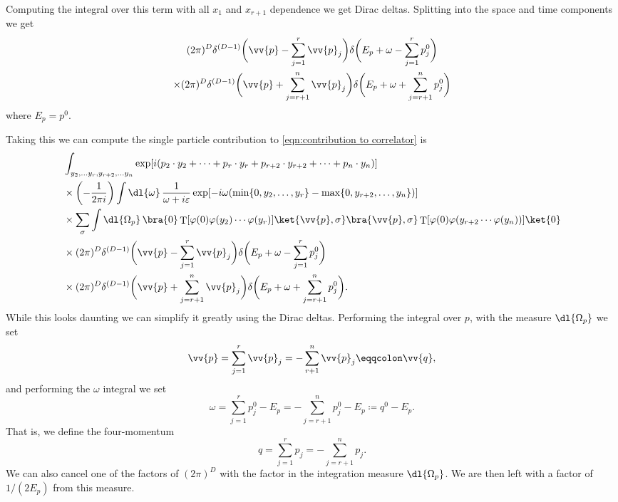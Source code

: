 \documentclass[fleqn]{NotesClass}
\DeclareMathOperator{\timeOrdering}{T}
\begin{document}
    Computing the integral over this term with all \(x_1\) and \(x_{r+1}\) dependence we get Dirac deltas.
    Splitting into the space and time components we get
    \begin{multline}
        (2\pi)^D\delta^{(D-1)}\bigg( \vv{p} - \sum_{j=1}^{r} \vv{p}_j \bigg) \delta\bigg( E_p + \omega - \sum_{j=1}^{r} p_j^0 \bigg)\\
        \times (2\pi)^D \delta^{(D-1)}\bigg( \vv{p} + \sum_{j=r+1}^{n} \vv{p}_j \bigg) \delta\bigg( E_p + \omega + \sum_{j = r+1}^{n} p_j^0 \bigg)
    \end{multline}
    where \(E_p = p^0\).
    
    Taking this we can compute the single particle contribution to \cref{eqn:contribution to correlator} is
    \begin{align}
        &\int_{y_2, \dotsc y_r, y_{r+2}, \dotsc y_n} \exp[i(p_2 \cdot y_2 + \dotsb + p_r \cdot y_r + p_{r+2} \cdot y_{r+2} + \dotsb + p_n \cdot y_n)] \notag\\
        &\times \left( -\frac{1}{2\pi i} \right) \int \dl{\omega} \, \frac{1}{\omega + i\varepsilon} \exp[-i\omega(\min\{0, y_2, \dotsc, y_r\} - \max\{0, y_{r+2}, \dotsc, y_{n}\})]\notag\\
        &\times \sum_\sigma \int \dl{\Omega_p} \, \bra{0} \timeOrdering[\varphi(0) \varphi(y_2) \dotsm \varphi(y_r)] \ket{\vv{p}, \sigma} \bra{\vv{p}, \sigma} \timeOrdering[\varphi(0) \varphi(y_{r+2} \dotsm \varphi(y_n))] \ket{0}\notag\\
        &\times (2\pi)^D \delta^{(D-1)} \bigg( \vv{p} - \sum_{j=1}^{r} \vv{p}_j \bigg) \delta\bigg(E_p + \omega - \sum_{j=1}^{r} p_j^0 \bigg)\notag\\
        &\times (2\pi)^D \delta^{(D-1)} \bigg( \vv{p} + \sum_{j=r+1}^{n} \vv{p}_j \bigg) \delta\bigg( E_p + \omega + \sum_{j = r+1}^{n} p_j^0 \bigg).
    \end{align}
    While this looks daunting we can simplify it greatly using the Dirac deltas.
    Performing the integral over \(p\), with the measure \(\dl{\Omega_p}\) we set
    \begin{equation}
        \vv{p} = \sum_{j=1}^{r}\vv{p}_j = - \sum_{r+1}^{n} \vv{p}_j \eqqcolon \vv{q},
    \end{equation}
    and performing the \(\omega\) integral we set
    \begin{equation}
        \omega = \sum_{j=1}^{r} p_j^0 - E_p = -\sum_{j=r+1}^{n} p_j^0 - E_p \coloneqq q^0 - E_p.
    \end{equation}
    That is, we define the four-momentum
    \begin{equation}
        q = \sum_{j=1}^{r} p_j = -\sum_{j=r+1}^{n} p_j.
    \end{equation}
    We can also cancel one of the factors of \((2\pi)^D\) with the factor in the integration measure \(\dl{\Omega_p}\).
    We are then left with a factor of \(1/(2E_p)\) from this measure.
    
\end{document}
